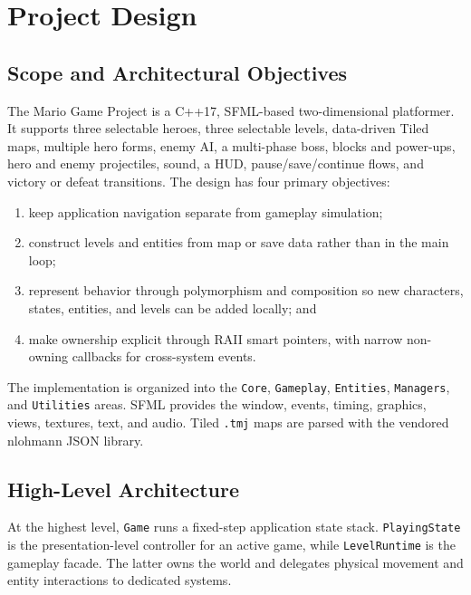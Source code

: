 \section{Project Design}
\label{sec:project-design}
\begingroup
\sloppy

\subsection{Scope and Architectural Objectives}

The Mario Game Project is a C++17, SFML-based two-dimensional platformer.  It
supports three selectable heroes, three selectable levels, data-driven Tiled
maps, multiple hero forms, enemy AI, a multi-phase boss, blocks and power-ups,
hero and enemy projectiles, sound, a HUD, pause/save/continue flows, and victory
or defeat transitions.  The design has four primary objectives:

\begin{enumerate}
    \item keep application navigation separate from gameplay simulation;
    \item construct levels and entities from map or save data rather than in
    the main loop;
    \item represent behavior through polymorphism and composition so new
    characters, states, entities, and levels can be added locally; and
    \item make ownership explicit through RAII smart pointers, with narrow
    non-owning callbacks for cross-system events.
\end{enumerate}

The implementation is organized into the \texttt{Core}, \texttt{Gameplay},
\texttt{Entities}, \texttt{Managers}, and \texttt{Utilities} areas.  SFML
provides the window, events, timing, graphics, views, textures, text, and audio.
Tiled \texttt{.tmj} maps are parsed with the vendored nlohmann JSON library.

\subsection{High-Level Architecture}

At the highest level, \texttt{Game} runs a fixed-step application state stack.
\texttt{PlayingState} is the presentation-level controller for an active game,
while \texttt{LevelRuntime} is the gameplay facade.  The latter owns the world
and delegates physical movement and entity interactions to dedicated systems.

